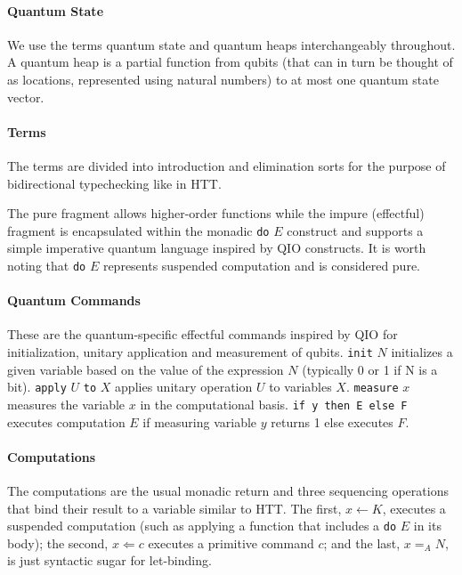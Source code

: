\documentclass[acmsmall,nonacm,timestamp,review=false,anonymous=false]{acmart}
\newcommand{\kw}[1]{\,\mathrm{\texttt{#1}}\,}
\begin{document}
\paragraph{Quantum State}

We use the terms quantum state and quantum heaps interchangeably throughout. A quantum heap is a partial function from qubits (that can in turn be thought of as locations, represented using natural numbers) to at most one quantum state vector.


\paragraph{Terms}
The terms are divided into introduction and elimination sorts for the purpose of bidirectional typechecking like in HTT.

The pure fragment allows higher-order functions while the impure (effectful) fragment is encapsulated within the monadic \texttt{do} $E$ construct and supports a simple imperative quantum language inspired by QIO constructs. It is worth noting that \texttt{do} $E$ represents suspended computation and is considered pure.

\paragraph{Quantum Commands}
These are the quantum-specific effectful commands inspired by QIO for initialization, unitary application and measurement of qubits.
\texttt{init} $N$ initializes a given variable based on the value of the expression $N$ (typically 0 or 1 if N is a bit).
\texttt{apply} $U$ \texttt{to} $X$ applies unitary operation $U$ to variables $X$.
\texttt{measure} $x$ measures the variable $x$ in the computational basis.
\texttt{if y then E else F} executes computation $E$ if measuring variable $y$ returns 1 else executes $F$.

\paragraph{Computations} The computations are the usual monadic return and three sequencing operations that bind their result to a variable similar to HTT. The first, $x \leftarrow K$, executes a suspended computation (such as applying a function that includes a \texttt{do} $E$ in its body); the second, $x \Leftarrow c$ executes a primitive command $c$; and the last, $x =_A N$, is just syntactic sugar for let-binding.
\end{document}
